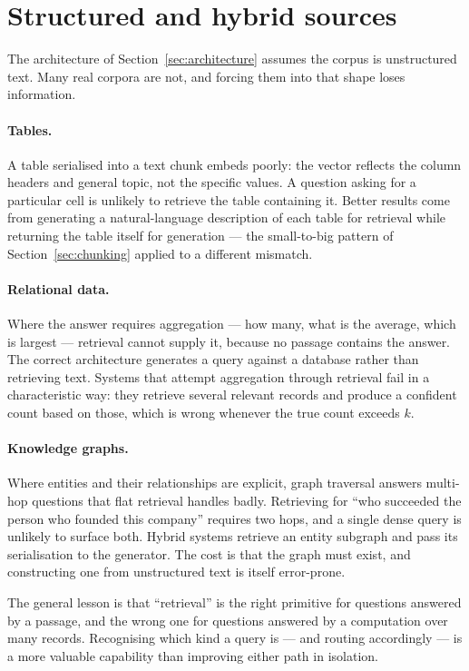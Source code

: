 \documentclass[11pt,a4paper]{article}
\begin{document}
\section{Structured and hybrid sources}
\label{sec:structured}

The architecture of Section~\ref{sec:architecture} assumes the corpus is
unstructured text. Many real corpora are not, and forcing them into that shape
loses information.

\paragraph{Tables.}
A table serialised into a text chunk embeds poorly: the vector reflects the
column headers and general topic, not the specific values. A question asking
for a particular cell is unlikely to retrieve the table containing it. Better
results come from generating a natural-language description of each table for
retrieval while returning the table itself for generation --- the
small-to-big pattern of Section~\ref{sec:chunking} applied to a different
mismatch.

\paragraph{Relational data.}
Where the answer requires aggregation --- how many, what is the average,
which is largest --- retrieval cannot supply it, because no passage contains
the answer. The correct architecture generates a query against a database
rather than retrieving text. Systems that attempt aggregation through
retrieval fail in a characteristic way: they retrieve several relevant records
and produce a confident count based on those, which is wrong whenever the true
count exceeds $k$.

\paragraph{Knowledge graphs.}
Where entities and their relationships are explicit, graph traversal answers
multi-hop questions that flat retrieval handles badly. Retrieving for ``who
succeeded the person who founded this company'' requires two hops, and a
single dense query is unlikely to surface both. Hybrid systems retrieve an
entity subgraph and pass its serialisation to the generator. The cost is that
the graph must exist, and constructing one from unstructured text is itself
error-prone.

The general lesson is that ``retrieval'' is the right primitive for questions
answered by a passage, and the wrong one for questions answered by a
computation over many records. Recognising which kind a query is --- and
routing accordingly --- is a more valuable capability than improving either
path in isolation.
\end{document}
